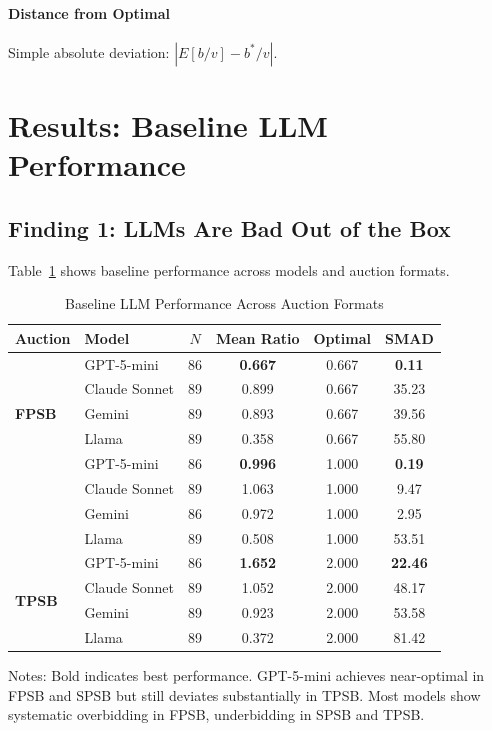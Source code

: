 \documentclass[12pt]{article}
\begin{document}
\paragraph{Distance from Optimal} Simple absolute deviation: $|E[b/v] - b^*/v|$.

\section{Results: Baseline LLM Performance}

\subsection{Finding 1: LLMs Are Bad Out of the Box}

Table~\ref{tab:model_comparison} shows baseline performance across models and auction formats.

\begin{table}[h]
\centering
\caption{Baseline LLM Performance Across Auction Formats}
\label{tab:model_comparison}
\begin{tabular}{llcccc}
\toprule
Auction & Model & $N$ & Mean Ratio & Optimal & SMAD \\
\midrule
\multirow{5}{*}{\textbf{FPSB}}
& GPT-5-mini & 86 & \textbf{0.667} & 0.667 & \textbf{0.11} \\
& Claude Sonnet & 89 & 0.899 & 0.667 & 35.23 \\
& Gemini & 89 & 0.893 & 0.667 & 39.56 \\
& Llama & 89 & 0.358 & 0.667 & 55.80 \\
\midrule
\multirow{5}{*}{\textbf{SPSB}}
& GPT-5-mini & 86 & \textbf{0.996} & 1.000 & \textbf{0.19} \\
& Claude Sonnet & 89 & 1.063 & 1.000 & 9.47 \\
& Gemini & 86 & 0.972 & 1.000 & 2.95 \\
& Llama & 89 & 0.508 & 1.000 & 53.51 \\
\midrule
\multirow{5}{*}{\textbf{TPSB}}
& GPT-5-mini & 86 & \textbf{1.652} & 2.000 & \textbf{22.46} \\
& Claude Sonnet & 89 & 1.052 & 2.000 & 48.17 \\
& Gemini & 89 & 0.923 & 2.000 & 53.58 \\
& Llama & 89 & 0.372 & 2.000 & 81.42 \\
\bottomrule
\end{tabular}
\smallskip
\begin{minipage}{0.95\textwidth}
\footnotesize
Notes: Bold indicates best performance. GPT-5-mini achieves near-optimal in FPSB and SPSB but still deviates substantially in TPSB. Most models show systematic overbidding in FPSB, underbidding in SPSB and TPSB.
\end{minipage}
\end{table}
\end{document}
